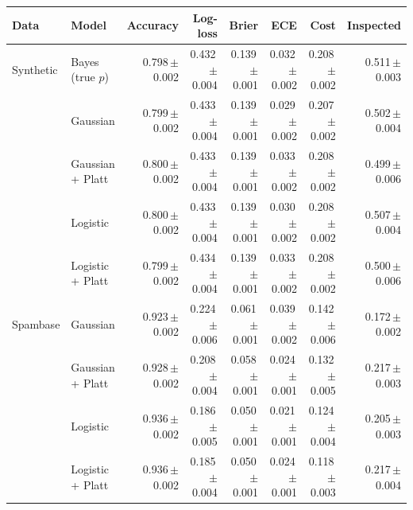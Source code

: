 \begin{tabular}{llrrrrrr}
\toprule
Data & Model & Accuracy & Log-loss & Brier & ECE & Cost & Inspected \\
\midrule
Synthetic & Bayes (true $p$) & 0.798\,{\scriptsize$\pm$0.002} & 0.432\,{\scriptsize$\pm$0.004} & 0.139\,{\scriptsize$\pm$0.001} & 0.032\,{\scriptsize$\pm$0.002} & 0.208\,{\scriptsize$\pm$0.002} & 0.511\,{\scriptsize$\pm$0.003} \\
 & Gaussian & 0.799\,{\scriptsize$\pm$0.002} & 0.433\,{\scriptsize$\pm$0.004} & 0.139\,{\scriptsize$\pm$0.001} & 0.029\,{\scriptsize$\pm$0.002} & 0.207\,{\scriptsize$\pm$0.002} & 0.502\,{\scriptsize$\pm$0.004} \\
 & Gaussian + Platt & 0.800\,{\scriptsize$\pm$0.002} & 0.433\,{\scriptsize$\pm$0.004} & 0.139\,{\scriptsize$\pm$0.001} & 0.033\,{\scriptsize$\pm$0.002} & 0.208\,{\scriptsize$\pm$0.002} & 0.499\,{\scriptsize$\pm$0.006} \\
 & Logistic & 0.800\,{\scriptsize$\pm$0.002} & 0.433\,{\scriptsize$\pm$0.004} & 0.139\,{\scriptsize$\pm$0.001} & 0.030\,{\scriptsize$\pm$0.002} & 0.208\,{\scriptsize$\pm$0.002} & 0.507\,{\scriptsize$\pm$0.004} \\
 & Logistic + Platt & 0.799\,{\scriptsize$\pm$0.002} & 0.434\,{\scriptsize$\pm$0.004} & 0.139\,{\scriptsize$\pm$0.001} & 0.033\,{\scriptsize$\pm$0.002} & 0.208\,{\scriptsize$\pm$0.002} & 0.500\,{\scriptsize$\pm$0.006} \\
\midrule
Spambase & Gaussian & 0.923\,{\scriptsize$\pm$0.002} & 0.224\,{\scriptsize$\pm$0.006} & 0.061\,{\scriptsize$\pm$0.001} & 0.039\,{\scriptsize$\pm$0.002} & 0.142\,{\scriptsize$\pm$0.006} & 0.172\,{\scriptsize$\pm$0.002} \\
 & Gaussian + Platt & 0.928\,{\scriptsize$\pm$0.002} & 0.208\,{\scriptsize$\pm$0.004} & 0.058\,{\scriptsize$\pm$0.001} & 0.024\,{\scriptsize$\pm$0.001} & 0.132\,{\scriptsize$\pm$0.005} & 0.217\,{\scriptsize$\pm$0.003} \\
 & Logistic & 0.936\,{\scriptsize$\pm$0.002} & 0.186\,{\scriptsize$\pm$0.005} & 0.050\,{\scriptsize$\pm$0.001} & 0.021\,{\scriptsize$\pm$0.001} & 0.124\,{\scriptsize$\pm$0.004} & 0.205\,{\scriptsize$\pm$0.003} \\
 & Logistic + Platt & 0.936\,{\scriptsize$\pm$0.002} & 0.185\,{\scriptsize$\pm$0.004} & 0.050\,{\scriptsize$\pm$0.001} & 0.024\,{\scriptsize$\pm$0.001} & 0.118\,{\scriptsize$\pm$0.003} & 0.217\,{\scriptsize$\pm$0.004} \\
\bottomrule
\end{tabular}
